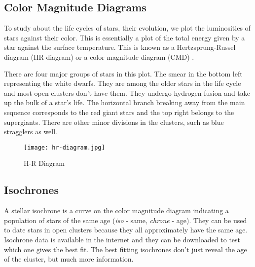 \subsection{Color Magnitude Diagrams}
To study about the life cycles of stars, their evolution, we plot the luminosities of stars against their color. This is essentially a plot of the total energy given by a star against the surface temperature. This is known as a Hertzsprung-Russel diagram (HR diagram) or a color magnitude diagram (CMD) \citep{introstars}. 

There are four major groups of stars in this plot. The smear in the bottom left representing the white dwarfs. They are among the older stars in the life cycle and most open clusters don't have them. They undergo hydrogen fusion and take up the bulk of a star's life. The horizontal branch breaking away from the main sequence corresponds to the red giant stars and the top right belongs to the supergiants. There are other minor divisions in the clusters, such as blue stragglers as well.  \citep{introstars}

\begin{figure}[H]
	\centering
	\texttt{[image: hr-diagram.jpg]}
	\caption{H-R Diagram \citep{wimecommons}}
	\label{fig:im1}
\end{figure}

\subsection{Isochrones}
A stellar isochrone is a curve on the color magnitude diagram indicating a population of stars of the same age (\textit{iso} - same, \textit{chrone} - age). They can be used to date stars in open clusters because they all approximately have the same age. Isochrone data is available in the internet and they can be downloaded to test which one gives the best fit. The best fitting isochrones don't just reveal the age of the cluster, but much more information.



